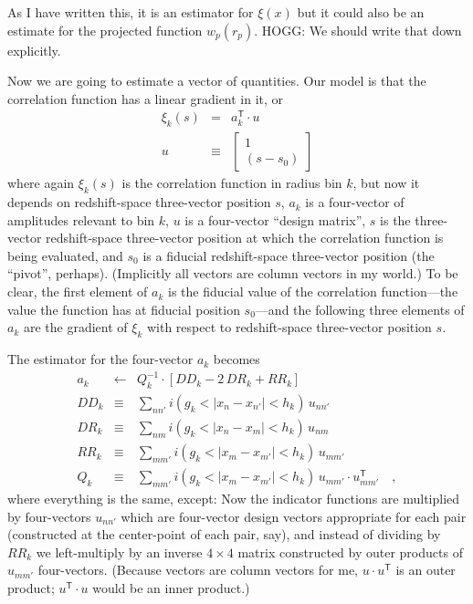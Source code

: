 \documentclass[12pt, letterpaper]{article}
\newcommand{\inv}{^{-1}}
\newcommand{\T}{^{\mathsf{T}}}
\begin{document}
As I have written this, it is an estimator for $\xi(x)$ but it could also
be an estimate for the projected function $w_p(r_p)$. HOGG: We should write
that down explicitly.

Now we are going to estimate a vector of quantities.
Our model is that the correlation function has a linear gradient in it, or
\begin{eqnarray}\displaystyle
\xi_k(s) &=& a_k\T\cdot u
\\
u &\equiv& \left[\begin{array}{c}1 \\ (s - s_0)\end{array}\right]
\end{eqnarray}
where
again $\xi_k(s)$ is the correlation function in radius bin $k$,
but now it depends on redshift-space three-vector position $s$,
$a_k$ is a four-vector of amplitudes relevant to bin $k$,
$u$ is a four-vector ``design matrix'',
$s$ is the three-vector redshift-space three-vector position
at which the correlation function is being evaluated,
and
$s_0$ is a fiducial redshift-space three-vector position (the ``pivot'', perhaps).
(Implicitly all vectors are column vectors in my world.)
To be clear, the first element of $a_k$ is the fiducial value of the correlation
function---the value the function has at fiducial position $s_0$---and the
following three elements of $a_k$ are the gradient of $\xi_k$ with respect to
redshift-space three-vector position $s$.

The estimator for the four-vector $a_k$ becomes
\begin{eqnarray}\displaystyle
a_k &\leftarrow& Q_k\inv\cdot [DD_k - 2\,DR_k + RR_k]
\\
DD_k &\equiv& \sum_{n n'} i(g_k < |x_n - x_{n'}| < h_k)\,u_{n n'}
\\
DR_k &\equiv& \sum_{n m} i(g_k < |x_n - x_m| < h_k)\,u_{n m}
\\
RR_k &\equiv& \sum_{m m'} i(g_k < |x_m - x_{m'}| < h_k)\,u_{m m'}
\\
Q_k &\equiv& \sum_{m m'} i(g_k < |x_m - x_{m'}| < h_k)\,u_{m m'} \cdot u_{m m'}\T
\quad ,
\end{eqnarray}
where
everything is the same, except:
Now the indicator functions are multiplied by four-vectors $u_{n n'}$ which are
four-vector design vectors appropriate for each pair (constructed at the center-point
of each pair, say),
and
instead of dividing by $RR_k$ we left-multiply by an inverse $4\times 4$ matrix
constructed by outer products of $u_{m m'}$ four-vectors.
(Because vectors are column vectors for me, $u\cdot u\T$ is an outer product;
$u\T\cdot u$ would be an inner product.)
\end{document}
